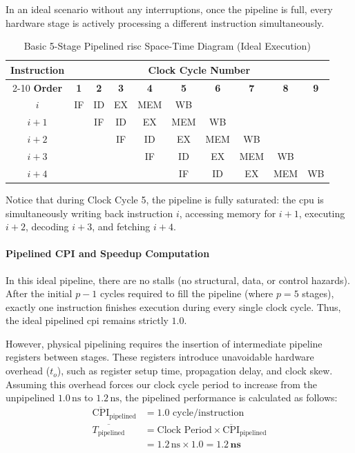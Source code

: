 In an ideal scenario without any interruptions, once the pipeline is full, every hardware stage is actively processing a different instruction simultaneously.

\begin{table}[!htbp]
    \centering
    \renewcommand{\arraystretch}{1.4}
    \begin{tabular}{|c|c|c|c|c|c|c|c|c|c|}
        \hline
        \textbf{Instruction} & \multicolumn{9}{c|}{\textbf{Clock Cycle Number}} \\
        \cline{2-10}
        \textbf{Order} & \textbf{1} & \textbf{2} & \textbf{3} & \textbf{4} & \textbf{5} & \textbf{6} & \textbf{7} & \textbf{8} & \textbf{9} \\
        \hline\hline
        \(i\)     & IF & ID & EX & MEM & WB &    &    &    &    \\
        \hline
        \(i+1\)   &    & IF & ID & EX & MEM & WB &    &    &    \\
        \hline
        \(i+2\)   &    &    & IF & ID & EX & MEM & WB &    &    \\
        \hline
        \(i+3\)   &    &    &    & IF & ID & EX & MEM & WB &    \\
        \hline
        \(i+4\)   &    &    &    &    & IF & ID & EX & MEM & WB \\
        \hline
    \end{tabular}
    \caption{Basic 5-Stage Pipelined \gls{risc} Space-Time Diagram (Ideal Execution)}
    \label{tab:pipeline-diagram}
\end{table}

\noindent Notice that during Clock Cycle 5, the pipeline is fully saturated: the \gls{cpu} is simultaneously writing back instruction \(i\), accessing memory for \(i+1\), executing \(i+2\), decoding \(i+3\), and fetching \(i+4\).

\paragraph{Pipelined CPI and Speedup Computation}
In this ideal pipeline, there are no stalls (no structural, data, or control hazards). After the initial \(p-1\) cycles required to fill the pipeline (where \(p=5\) stages), exactly one instruction finishes execution during every single clock cycle. Thus, the ideal pipelined \gls{cpi} remains strictly $1.0$.

However, physical pipelining requires the insertion of intermediate pipeline registers between stages. These registers introduce unavoidable hardware overhead (\(t_o\)), such as register setup time, propagation delay, and clock skew. Assuming this overhead forces our clock cycle period to increase from the unpipelined \(1.0\,\text{ns}\) to \(1.2\,\text{ns}\), the pipelined performance is calculated as follows:
\begin{align*}
    \overline{\text{CPI}}_{\text{pipelined}} &= 1.0 \text{ cycle/instruction} \\
    \overline{T_{\text{pipelined}}} &= \text{Clock Period} \times \overline{\text{CPI}}_{\text{pipelined}} \\
                                    &= 1.2\,\text{ns} \times 1.0 = \mathbf{1.2\,\text{ns}}
\end{align*}

